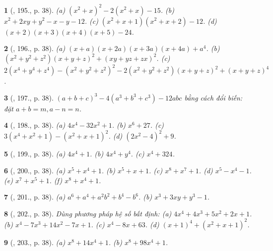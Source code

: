 \documentclass{article}
\newtheorem{baitoan}{}
\begin{document}
\begin{baitoan}[\cite{Binh_Toan_8_tap_1}, 195., p. 38]
	(a) $(x^2 + x)^2 - 2(x^2 + x) - 15$. (b) $x^2 + 2xy + y^2 - x - y - 12$. (c) $(x^2 + x + 1)(x^2 + x + 2) - 12$. (d) $(x + 2)(x + 3)(x + 4)(x + 5) - 24$.
\end{baitoan}

\begin{baitoan}[\cite{Binh_Toan_8_tap_1}, 196., p. 38]
	(a) $(x + a)(x + 2a)(x + 3a)(x + 4a) + a^4$. (b) $(x^2 + y^2 + z^2)(x + y + z)^2 + (xy + yz + zx)^2$. (c) $2(x^4 + y^4 + z^4) - (x^2 + y^2 + z^2)^2 - 2(x^2 + y^2 + z^2)(x + y + z)^2 + (x + y + z)^4$.
\end{baitoan}

\begin{baitoan}[\cite{Binh_Toan_8_tap_1}, 197., p. 38]
	$(a + b + c)^3 - 4(a^3 + b^3 + c^3) - 12abc$ bằng cách đổi biến: đặt $a + b = m,a - n = n$.
\end{baitoan}

\begin{baitoan}[\cite{Binh_Toan_8_tap_1}, 198., p. 38]
	(a) $4x^4 - 32x^2 + 1$. (b) $x^6 + 27$. (c) $3(x^4 + x^2 + 1) - (x^2 + x + 1)^2$. (d) $(2x^2 - 4)^2 + 9$.
\end{baitoan}

\begin{baitoan}[\cite{Binh_Toan_8_tap_1}, 199., p. 38]
	(a) $4x^4 + 1$. (b) $4x^4 + y^4$. (c) $x^4 + 324$.
\end{baitoan}

\begin{baitoan}[\cite{Binh_Toan_8_tap_1}, 200., p. 38]
	(a) $x^5 + x^4 + 1$. (b) $x^5 + x + 1$. (c) $x^8 + x^7 + 1$. (d) $x^5 - x^4 - 1$. (e) $x^7 + x^5 + 1$. (f) $x^8 + x^4 + 1$.
\end{baitoan}

\begin{baitoan}[\cite{Binh_Toan_8_tap_1}, 201., p. 38]
	(a) $a^6 + a^4 + a^2b^2 + b^4 - b^6$. (b) $x^3 + 3xy + y^3  - 1$.
\end{baitoan}

\begin{baitoan}[\cite{Binh_Toan_8_tap_1}, 202., p. 38]
	Dùng phương pháp hệ số bất định: (a) $4x^4 + 4x^3 + 5x^2 + 2x + 1$. (b) $x^4 - 7x^3 + 14x^2 - 7x + 1$. (c) $x^4 - 8x + 63$. (d) $(x + 1)^4 + (x^2 + x + 1)^2$.
\end{baitoan}

\begin{baitoan}[\cite{Binh_Toan_8_tap_1}, 203., p. 38]
	(a) $x^8 + 14x^4 + 1$. (b) $x^8 + 98x^4 + 1$.
\end{baitoan}
\end{document}
